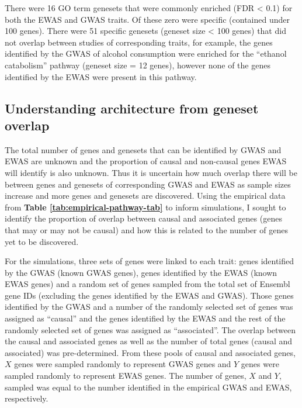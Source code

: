\documentclass[11pt,oneside]{bristolthesis}
\begin{document}
There were 16 GO term genesets that were commonly enriched (FDR \textless{} 0.1) for both the EWAS and GWAS traits. Of these zero were specific (contained under 100 genes). There were 51 specific genesets (geneset size \textless{} 100 genes) that did not overlap between studies of corresponding traits, for example, the genes identified by the GWAS of alcohol consumption were enriched for the ``ethanol catabolism'' pathway (geneset size = 12 genes), however none of the genes identified by the EWAS were present in this pathway.

\hypertarget{architecture-sims}{%
\subsection{Understanding architecture from geneset overlap}\label{architecture-sims}}

The total number of genes and genesets that can be identified by GWAS and EWAS are unknown and the proportion of causal and non-causal genes EWAS will identify is also unknown. Thus it is uncertain how much overlap there will be between genes and genesets of corresponding GWAS and EWAS as sample sizes increase and more genes and genesets are discovered. Using the empirical data from \textbf{Table \ref{tab:empirical-pathway-tab}} to inform simulations, I sought to identify the proportion of overlap between causal and associated genes (genes that may or may not be causal) and how this is related to the number of genes yet to be discovered.

For the simulations, three sets of genes were linked to each trait: genes identified by the GWAS (known GWAS genes), genes identified by the EWAS (known EWAS genes) and a random set of genes sampled from the total set of Ensembl gene IDs (excluding the genes identified by the EWAS and GWAS). Those genes identified by the GWAS and a number of the randomly selected set of genes was assigned as ``causal'' and the genes identified by the EWAS and the rest of the randomly selected set of genes was assigned as ``associated''. The overlap between the causal and associated genes as well as the number of total genes (causal and associated) was pre-determined. From these pools of causal and associated genes, \(X\) genes were sampled randomly to represent GWAS genes and \(Y\) genes were sampled randomly to represent EWAS genes. The number of genes, \(X\) and \(Y\), sampled was equal to the number identified in the empirical GWAS and EWAS, respectively.
\end{document}
